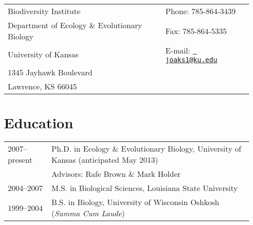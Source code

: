 \documentclass[10pt]{article}
\begin{document}
\raggedright
\singlespacing

\noindent\begin{tabular*}{\textwidth}[tb]{ @{}l @{\extracolsep{\fill}} l@{}}
Biodiversity Institute  & Phone: 785-864-3439 \\
Department of Ecology \& Evolutionary Biology & Fax: 785-864-5335 \\
University of Kansas    & E-mail: \href{mailto:joaks1@gmail.com}{\tt
                          joaks1@ku.edu} \\
1345 Jayhawk Boulevard  & \\
Lawrence, KS 66045      & \\
\end{tabular*}

\section*{Education}
\noindent\begin{tabulary}{\textwidth}{ @{} l L @{} }
2007--present & Ph.D. in Ecology \& Evolutionary Biology, University of Kansas
                (anticipated May 2013) \\
              & \addtolength{\leftskip}{5mm}Advisors:  Rafe Brown \& Mark
                Holder \\[0.25em]
2004--2007    & M.S. in Biological Sciences, Louisiana State University
                \\[0.25em]
1999--2004    & B.S. in Biology, University of Wisconsin Oshkosh (\emph{Summa
                Cum Laude}) \\
\end{tabulary}
\end{document}

